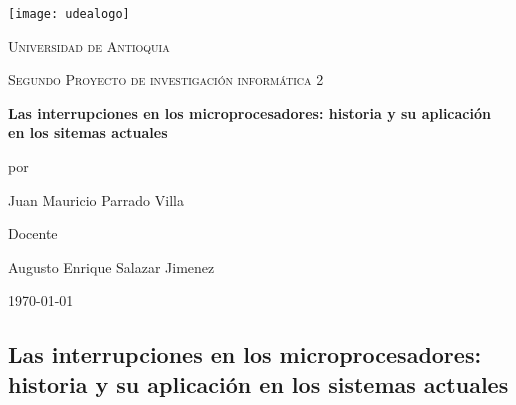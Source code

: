 \documentclass[12pt,a4paper]{report}
\begin{document}
   

    \begin{titlepage}

               \centering


               \texttt{[image: udealogo]}\par\vspace{1cm}

               {\scshape\LARGE Universidad de Antioquia \par}

               \vspace{1cm}

               {\scshape\large Segundo Proyecto de investigación informática 2\par}

               \vspace{1.5cm}

               {\Large\bfseries Las interrupciones en los microprocesadores: historia y su aplicación en los sitemas actuales\par}

               \vspace{2cm}

               por\par

               {\Large Juan Mauricio Parrado Villa\par}


               \vspace{2cm}

               Docente\par

               {\Large Augusto Enrique Salazar Jimenez}


               \vfill


               {\large \today\par}

    \end{titlepage}

    \large

    \begin{center}

        \section*{Las interrupciones en los microprocesadores: historia y su aplicación en los sistemas actuales}

    \end{center}
        
\end{document}
